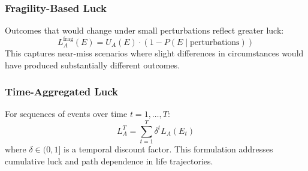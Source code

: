 \subsubsection{Fragility-Based Luck}

Outcomes that would change under small perturbations reflect greater
luck:
\begin{equation}
  L_{A}^{\text{frag}}(E) = U_{A}(E) \cdot \left(1 - P(E \mid \text{perturbations}
  )\right)
\end{equation}
This captures near-miss scenarios where slight differences in circumstances
would have produced substantially different outcomes.

\subsubsection{Time-Aggregated Luck}

For sequences of events over time $t = 1, \ldots, T$:
\begin{equation}
  L_{A}^{T}= \sum_{t=1}^{T}\delta^{t}L_{A}(E_{t})
\end{equation}
where $\delta \in (0,1]$ is a temporal discount factor. This formulation
addresses cumulative luck and path dependence in life trajectories.

